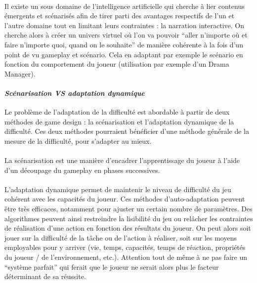 \paragraph{}Il existe un sous domaine de l’intelligence artificielle qui cherche à lier contenus émergents et scénarisés afin de tirer parti des avantages respectifs de l’un et l’autre domaine tout en limitant leurs contraintes : la narration interactive. On cherche alors à créer un univers virtuel où l’on va pouvoir “aller n’importe où et faire n’importe quoi, quand on le souhaite” de manière cohérente à la fois d’un point de vu gameplay et scénario. Cela en adaptant par exemple le scénario en fonction du comportement du joueur (utilisation par exemple d’un Drama Manager).

			\paragraph{\emph{Scénarisation VS adaptation dynamique} \\ \quad}
Le problème de l’adaptation de la difficulté est abordable à partir de deux méthodes de game design : la scénarisation et l’adaptation dynamique de la difficulté.  Ces deux méthodes pourraient bénéficier d’une méthode générale de la mesure de la difficulté, pour s’adapter au mieux.

\paragraph{}La scénarisation est une manière d’encadrer l’apprentissage du joueur à l’aide d’un découpage du gameplay en phases successives. 

\paragraph{}L’adaptation dynamique permet de maintenir le niveau de difficulté du jeu cohérent avec les capacités du joueur. Ces méthodes d’auto-adaptation peuvent être très efficaces, notamment pour ajuster un certain nombre de paramètres. Des algorithmes peuvent ainsi restreindre la lisibilité du jeu ou relâcher les contraintes de réalisation d’une action en fonction des résultats du joueur. On peut alors soit jouer sur la difficulté de la tâche ou de l’action à réaliser, soit sur les moyens employables pour y arriver (vie, temps, capacités, temps de réaction, propriétés du joueur / de l’environnement, etc.). Attention tout de même à ne pas faire un “système parfait” qui ferait que le joueur ne serait alors plus le facteur déterminant de sa réussite.


